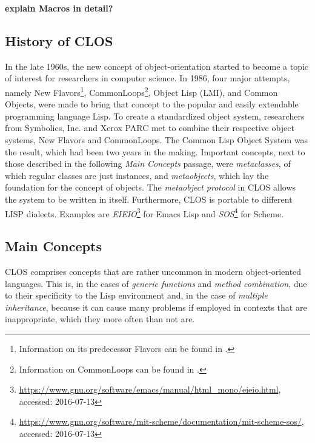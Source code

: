 \documentclass[oribibl]{llncs}
\begin{document}
\textbf{explain Macros in detail?}


\subsection{History of CLOS}
\label{sec:history}

In the late 1960s, the new concept of object-orientation started to become a topic of interest for researchers in computer science. In 1986, four major attempts, namely New Flavors\footnote{Information on its predecessor Flavors can be found in \cite{Moon:1986:OPF:28697.28698}.}, CommonLoops\footnote{Information on CommonLoops can be found in \cite{Bobrow:1986:CML:28697.28700}.}, Object Lisp (LMI), and Common Objects, were made to bring that concept to the popular and easily extendable programming language Lisp. \cite{steele1993evolution} To create a standardized object system, researchers from Symbolics, Inc. and Xerox PARC met to combine their respective object systems, New Flavors and CommonLoops. \cite{demichiel1987common} The Common Lisp Object System was the result, which had been two years in the making. \cite{steele1993evolution} Important concepts, next to those described in the following \emph{Main Concepts} passage, were \emph{metaclasses}, of which regular classes are just instances, and \emph{metaobjects}, which lay the foundation for the concept of objects. \cite{kiczales1991art} The \emph{metaobject protocol} in CLOS allows the system to be written in itself. \cite{steele1993evolution} Furthermore, CLOS is portable to different LISP dialects. Examples are \emph{EIEIO}\footnote{\url{https://www.gnu.org/software/emacs/manual/html_mono/eieio.html}, accessed: 2016-07-13} for Emacs Lisp and \emph{SOS}\footnote{\url{https://www.gnu.org/software/mit-scheme/documentation/mit-scheme-sos/}, accessed: 2016-07-13} for Scheme.

\subsection{Main Concepts}
\label{sec:concepts}

CLOS comprises concepts that are rather uncommon in modern object-oriented languages. This is, in the cases of \emph{generic functions} and \emph{method combination}, due to their specificity to the Lisp environment and, in the case of \emph{multiple inheritance}, because it can cause many problems if employed in contexts that are inappropriate, which they more often than not are. \cite{XXX} 
\end{document}
